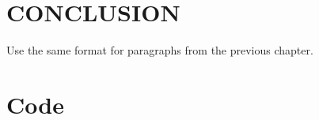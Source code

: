 \documentclass[12pt,a4paper]{report}
\begin{document}
\chapter{CONCLUSION}
\thispagestyle{fancy}
\onehalfspacing
\hspace*{1cm}Use the same format for paragraphs from the previous chapter.





   
\newpage


\pagestyle{plain}
\appendix

\clearpage
\appendix
\renewcommand{\thechapter}{\Roman{chapter}}
\renewcommand*{\thepage}{\roman{page}}
\setcounter{page}{14} %

\chapter{Code}
\end{document}
